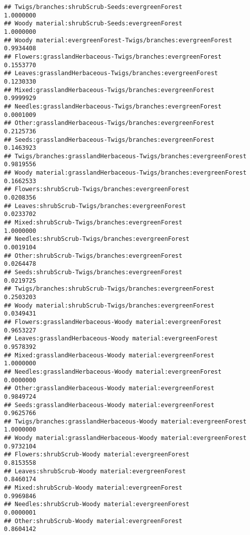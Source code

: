 \documentclass[
]{article}
\begin{document}
\begin{verbatim}
## Twigs/branches:shrubScrub-Seeds:evergreenForest                       1.0000000
## Woody material:shrubScrub-Seeds:evergreenForest                       1.0000000
## Woody material:evergreenForest-Twigs/branches:evergreenForest         0.9934408
## Flowers:grasslandHerbaceous-Twigs/branches:evergreenForest            0.1553770
## Leaves:grasslandHerbaceous-Twigs/branches:evergreenForest             0.1230330
## Mixed:grasslandHerbaceous-Twigs/branches:evergreenForest              0.9999929
## Needles:grasslandHerbaceous-Twigs/branches:evergreenForest            0.0001009
## Other:grasslandHerbaceous-Twigs/branches:evergreenForest              0.2125736
## Seeds:grasslandHerbaceous-Twigs/branches:evergreenForest              0.1463923
## Twigs/branches:grasslandHerbaceous-Twigs/branches:evergreenForest     0.9819556
## Woody material:grasslandHerbaceous-Twigs/branches:evergreenForest     0.1662533
## Flowers:shrubScrub-Twigs/branches:evergreenForest                     0.0208356
## Leaves:shrubScrub-Twigs/branches:evergreenForest                      0.0233702
## Mixed:shrubScrub-Twigs/branches:evergreenForest                       1.0000000
## Needles:shrubScrub-Twigs/branches:evergreenForest                     0.0019104
## Other:shrubScrub-Twigs/branches:evergreenForest                       0.0264478
## Seeds:shrubScrub-Twigs/branches:evergreenForest                       0.0219725
## Twigs/branches:shrubScrub-Twigs/branches:evergreenForest              0.2503203
## Woody material:shrubScrub-Twigs/branches:evergreenForest              0.0349431
## Flowers:grasslandHerbaceous-Woody material:evergreenForest            0.9653227
## Leaves:grasslandHerbaceous-Woody material:evergreenForest             0.9578392
## Mixed:grasslandHerbaceous-Woody material:evergreenForest              1.0000000
## Needles:grasslandHerbaceous-Woody material:evergreenForest            0.0000000
## Other:grasslandHerbaceous-Woody material:evergreenForest              0.9849724
## Seeds:grasslandHerbaceous-Woody material:evergreenForest              0.9625766
## Twigs/branches:grasslandHerbaceous-Woody material:evergreenForest     1.0000000
## Woody material:grasslandHerbaceous-Woody material:evergreenForest     0.9732104
## Flowers:shrubScrub-Woody material:evergreenForest                     0.8153558
## Leaves:shrubScrub-Woody material:evergreenForest                      0.8460174
## Mixed:shrubScrub-Woody material:evergreenForest                       0.9969846
## Needles:shrubScrub-Woody material:evergreenForest                     0.0000001
## Other:shrubScrub-Woody material:evergreenForest                       0.8604142

\end{verbatim}
\end{document}
